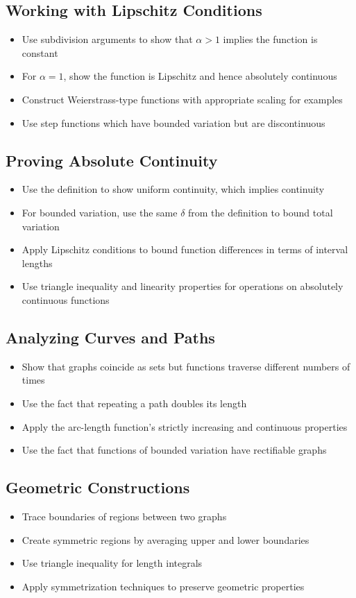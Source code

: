 \subsection*{Working with Lipschitz Conditions}
\begin{itemize}
\item Use subdivision arguments to show that $\alpha > 1$ implies the function is constant
\item For $\alpha = 1$, show the function is Lipschitz and hence absolutely continuous
\item Construct Weierstrass-type functions with appropriate scaling for examples
\item Use step functions which have bounded variation but are discontinuous
\end{itemize}

\subsection*{Proving Absolute Continuity}
\begin{itemize}
\item Use the definition to show uniform continuity, which implies continuity
\item For bounded variation, use the same $\delta$ from the definition to bound total variation
\item Apply Lipschitz conditions to bound function differences in terms of interval lengths
\item Use triangle inequality and linearity properties for operations on absolutely continuous functions
\end{itemize}

\subsection*{Analyzing Curves and Paths}
\begin{itemize}
\item Show that graphs coincide as sets but functions traverse different numbers of times
\item Use the fact that repeating a path doubles its length
\item Apply the arc-length function's strictly increasing and continuous properties
\item Use the fact that functions of bounded variation have rectifiable graphs
\end{itemize}

\subsection*{Geometric Constructions}
\begin{itemize}
\item Trace boundaries of regions between two graphs
\item Create symmetric regions by averaging upper and lower boundaries
\item Use triangle inequality for length integrals
\item Apply symmetrization techniques to preserve geometric properties
\end{itemize}